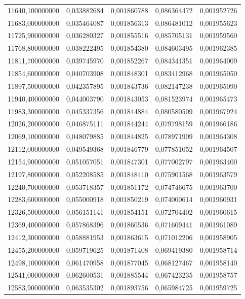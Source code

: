 \begin{longtable}{rrrrr}
11640,100000000 & 0,033882684 & 0,001860788 & 0,086364472 & 0,001952726\\
11683,000000000 & 0,035464087 & 0,001856313 & 0,086481012 & 0,001955623\\
11725,900000000 & 0,036280327 & 0,001855516 & 0,085705131 & 0,001959560\\
11768,800000000 & 0,038222495 & 0,001854380 & 0,084603495 & 0,001962385\\
11811,700000000 & 0,039745970 & 0,001852267 & 0,084341351 & 0,001964009\\
11854,600000000 & 0,040703908 & 0,001848301 & 0,083412968 & 0,001965050\\
11897,500000000 & 0,042357895 & 0,001843736 & 0,082147238 & 0,001965090\\
11940,400000000 & 0,044003790 & 0,001843053 & 0,081523974 & 0,001965473\\
11983,300000000 & 0,045337356 & 0,001844884 & 0,080580509 & 0,001967924\\
12026,200000000 & 0,046875111 & 0,001844244 & 0,079798159 & 0,001966186\\
12069,100000000 & 0,048079885 & 0,001844825 & 0,078971909 & 0,001964308\\
12112,000000000 & 0,049549368 & 0,001846779 & 0,077851052 & 0,001964507\\
12154,900000000 & 0,051057051 & 0,001847301 & 0,077002797 & 0,001963400\\
12197,800000000 & 0,052208585 & 0,001848410 & 0,075901568 & 0,001963579\\
12240,700000000 & 0,053718357 & 0,001851172 & 0,074746675 & 0,001963700\\
12283,600000000 & 0,055000918 & 0,001850219 & 0,074000614 & 0,001960931\\
12326,500000000 & 0,056151141 & 0,001854151 & 0,072704402 & 0,001960615\\
12369,400000000 & 0,057868396 & 0,001860536 & 0,071609441 & 0,001961089\\
12412,300000000 & 0,058881953 & 0,001863615 & 0,071012206 & 0,001958905\\
12455,200000000 & 0,059719625 & 0,001871408 & 0,069419380 & 0,001958714\\
12498,100000000 & 0,061470958 & 0,001877045 & 0,068127467 & 0,001958140\\
12541,000000000 & 0,062600531 & 0,001885544 & 0,067423235 & 0,001958757\\
12583,900000000 & 0,063535302 & 0,001893756 & 0,065984725 & 0,001959725\\

\end{longtable}
